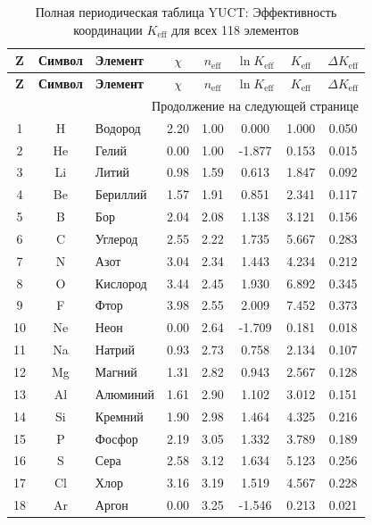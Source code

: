 \documentclass[12pt,a4paper]{article}
\theoremstyle{remark}
\newcommand{\Keff}{K_{\mathrm{eff}}}
\begin{document}
	\begin{longtable}{|c|c|p{2.5cm}|c|c|c|c|c|}
		\caption{Полная периодическая таблица YUCT: Эффективность координации $\Keff$ для всех 118 элементов}
		\label{tab:complete-periodic} \\
		\hline
		\textbf{Z} & \textbf{Символ} & \textbf{Элемент} & $\chi$ & $n_{\text{eff}}$ & $\ln \Keff$ & $\Keff$ & $\Delta \Keff$ \\
		\hline
		\endfirsthead
		\hline
		\textbf{Z} & \textbf{Символ} & \textbf{Элемент} & $\chi$ & $n_{\text{eff}}$ & $\ln \Keff$ & $\Keff$ & $\Delta \Keff$ \\
		\hline
		\endhead
		\hline \multicolumn{8}{|r|}{Продолжение на следующей странице} \\ \hline
		\endfoot
		\hline
		\endlastfoot
		
		1 & H & Водород & 2.20 & 1.00 & 0.000 & 1.000 & 0.050 \\
		2 & He & Гелий & 0.00 & 1.00 & -1.877 & 0.153 & 0.015 \\
		3 & Li & Литий & 0.98 & 1.59 & 0.613 & 1.847 & 0.092 \\
		4 & Be & Бериллий & 1.57 & 1.91 & 0.851 & 2.341 & 0.117 \\
		5 & B & Бор & 2.04 & 2.08 & 1.138 & 3.121 & 0.156 \\
		6 & C & Углерод & 2.55 & 2.22 & 1.735 & 5.667 & 0.283 \\
		7 & N & Азот & 3.04 & 2.34 & 1.443 & 4.234 & 0.212 \\
		8 & O & Кислород & 3.44 & 2.45 & 1.930 & 6.892 & 0.345 \\
		9 & F & Фтор & 3.98 & 2.55 & 2.009 & 7.452 & 0.373 \\
		10 & Ne & Неон & 0.00 & 2.64 & -1.709 & 0.181 & 0.018 \\
		11 & Na & Натрий & 0.93 & 2.73 & 0.758 & 2.134 & 0.107 \\
		12 & Mg & Магний & 1.31 & 2.82 & 0.943 & 2.567 & 0.128 \\
		13 & Al & Алюминий & 1.61 & 2.90 & 1.102 & 3.012 & 0.151 \\
		14 & Si & Кремний & 1.90 & 2.98 & 1.464 & 4.325 & 0.216 \\
		15 & P & Фосфор & 2.19 & 3.05 & 1.332 & 3.789 & 0.189 \\
		16 & S & Сера & 2.58 & 3.12 & 1.634 & 5.123 & 0.256 \\
		17 & Cl & Хлор & 3.16 & 3.19 & 1.519 & 4.567 & 0.228 \\
		18 & Ar & Аргон & 0.00 & 3.25 & -1.546 & 0.213 & 0.021 \\

\end{longtable}
\end{document}
